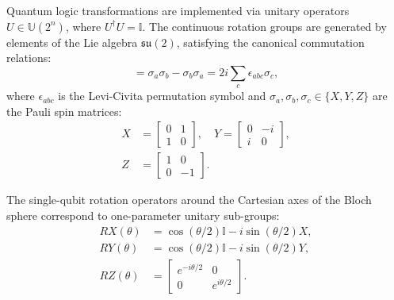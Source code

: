 \documentclass[pdflatex,sn-mathphys-num]{sn-jnl}%
\theoremstyle{thmstyleone}%
\theoremstyle{thmstyletwo}%
\theoremstyle{thmstylethree}%
\begin{document}
Quantum logic transformations are implemented via unitary operators $U \in \mathbb{U}(2^n)$, where $U^\dagger U = \mathbb{I}$. The continuous rotation groups are generated by elements of the Lie algebra $\mathfrak{su}(2)$, satisfying the canonical commutation relations:
\begin{equation}
[\sigma_a, \sigma_b] = \sigma_a \sigma_b - \sigma_b \sigma_a = 2i \sum_{c} \epsilon_{abc} \sigma_c,
\label{eq:lie_commutation}
\end{equation}
where $\epsilon_{abc}$ is the Levi-Civita permutation symbol and $\sigma_a, \sigma_b, \sigma_c \in \{X, Y, Z\}$ are the Pauli spin matrices:
\begin{align}
X &= \begin{bmatrix} 0 & 1 \\ 1 & 0 \end{bmatrix}, \quad Y = \begin{bmatrix} 0 & -i \\ i & 0 \end{bmatrix}, \nonumber \\
Z &= \begin{bmatrix} 1 & 0 \\ 0 & -1 \end{bmatrix}.
\label{eq:pauli_matrices}
\end{align}

The single-qubit rotation operators around the Cartesian axes of the Bloch sphere correspond to one-parameter unitary sub-groups:
\begin{align}
RX(\theta) &= \cos(\theta/2) \mathbb{I} - i \sin(\theta/2) X, \label{eq:rx_gate} \\
RY(\theta) &= \cos(\theta/2) \mathbb{I} - i \sin(\theta/2) Y, \label{eq:ry_gate} \\
RZ(\theta) &= \begin{bmatrix} e^{-i\theta/2} & 0 \\ 0 & e^{i\theta/2} \end{bmatrix}. \label{eq:rz_gate}
\end{align}
\end{document}
